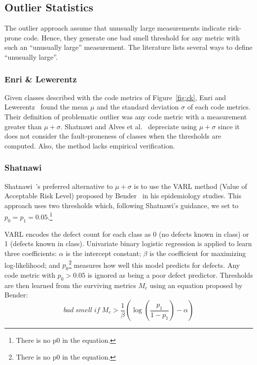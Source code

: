 \documentclass[twocolumn,5p]{elsarticle}
\newcommand{\fig}[1]{Figure~\ref{fig:#1}}
\theoremstyle{break}
\begin{document}
\subsection{Outlier Statistics}

The outlier approach assume that unusually large measurements indicate risk-prone code.
Hence, they generate one bad smell threshold for any metric
with such an ``unusually large'' measurement. 
The literature lists several ways to define ``unusually large''.





\subsubsection{Enri \& Lewerentz}
Given classes described with the  code metrics of \fig{ck},
Enri and Lewerentz~\cite{erni96} found the   mean $\mu$ and the standard deviation $\sigma$
of each
code metrics. Their definition of problematic outlier was any code
metric with a measurement greater than $\mu+\sigma$.
Shatnawi and Alves et al.~\cite{Shatnawi10,Alves2010} depreciate
using $\mu+\sigma$ since it does not consider the fault-proneness of classes when the thresholds are computed. Also, the method lacks  empirical verification.

\subsubsection{ Shatnawi}
Shatnawi~\cite{Shatnawi10}'s preferred alternative to $\mu+\sigma$
is to use the VARL method (Value of Acceptable Risk Level) proposed by Bender~\cite{bender99} in his epidemiology studies.  This approach uses two
thresholds which, following Shatnawi's guidance, we set to
$p_0=p_1=0.05$.\footnote{There is no p0 in the equation.} 

VARL encodes the defect count
for each class as 0 (no defects known in class) or 1 (defects known in class).
Univariate binary logistic regression is applied to learn three coefficients:  
 $\alpha$ is the intercept constant;
    $\beta$ is the coefficient for maximizing log-likelihood;
  and $p_0$\footnote{There is no p0 in the equation.}  
    measures   how well this   model predicts for   defects.
Any code metric with $p_0>0.05$ is  ignored as being a poor defect predictor. Thresholds are then learned from the surviving metrics $M_c$ using
an equation proposed by Bender:
\begin{equation}
 \mathit{bad\; smell\; if\;} M_c > \frac{1}{\beta }\left( {\log \left( {\frac{{{p_1}}}{{1 - {p_1}}}} \right) - \alpha } \right) 
\end{equation}
\end{document}
